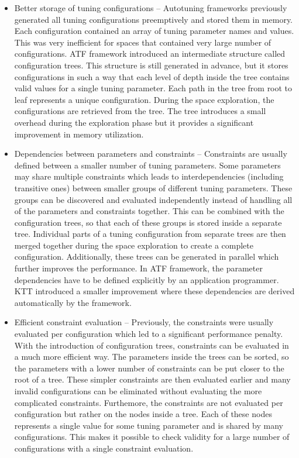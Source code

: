 \documentclass[
  digital,     %
  oneside,     %
  nosansbold,  %
  nocolorbold, %
  lof,         %
  lot,         %
  nocover
]{fithesis4}
\begin{document}
\begin{itemize}
	\item Better storage of tuning configurations -- Autotuning frameworks previously generated all tuning configurations preemptively and stored them in memory. Each configuration contained an array of tuning parameter names and values. This was very inefficient for spaces that contained very large number of configurations. ATF framework introduced an intermediate structure called configuration trees. This structure is still generated in advance, but it stores configurations in such a way that each level of depth inside the tree contains valid values for a single tuning parameter. Each path in the tree from root to leaf represents a unique configuration. During the space exploration, the configurations are retrieved from the tree. The tree introduces a small overhead during the exploration phase but it provides a significant improvement in memory utilization.
	\item Dependencies between parameters and constraints -- Constraints are usually defined between a smaller number of tuning parameters. Some parameters may share multiple constraints which leads to interdependencies (including transitive ones) between smaller groups of different tuning parameters. These groups can be discovered and evaluated independently instead of handling all of the parameters and constraints together. This can be combined with the configuration trees, so that each of these groups is stored inside a separate tree. Individual parts of a tuning configuration from separate trees are then merged together during the space exploration to create a complete configuration. Additionally, these trees can be generated in parallel which further improves the performance. In ATF framework, the parameter dependencies have to be defined explicitly by an application programmer. KTT introduced a smaller improvement where these dependencies are derived automatically by the framework.
	\item Efficient constraint evaluation -- Previously, the constraints were usually evaluated per configuration which led to a significant performance penalty. With the introduction of configuration trees, constraints can be evaluated in a much more efficient way. The parameters inside the trees can be sorted, so the parameters with a lower number of constraints can be put closer to the root of a tree. These simpler constraints are then evaluated earlier and many invalid configurations can be eliminated without evaluating the more complicated constraints. Furthemore, the constraints are not evaluated per configuration but rather on the nodes inside a tree. Each of these nodes represents a single value for some tuning parameter and is shared by many configurations. This makes it possible to check validity for a large number of configurations with a single constraint evaluation.
\end{itemize}
\end{document}
